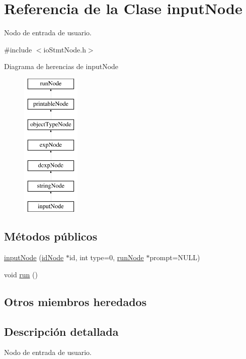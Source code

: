 \hypertarget{classinputNode}{\section{Referencia de la Clase input\-Node}
\label{classinputNode}
}


Nodo de entrada de usuario.  




{\ttfamily \#include $<$io\-Stmt\-Node.\-h$>$}

Diagrama de herencias de input\-Node\begin{figure}[H]
\begin{center}
\leavevmode
\includegraphics[height=7.000000cm]{classinputNode}
\end{center}
\end{figure}
\subsection*{Métodos públicos}
\begin{DoxyCompactItemize}
\item 
\hyperlink{classinputNode_a996e71eabef3f228d948bf8698381bad}{input\-Node} (\hyperlink{classidNode}{id\-Node} $\ast$id, int type=0, \hyperlink{classrunNode}{run\-Node} $\ast$prompt=N\-U\-L\-L)
\item 
void \hyperlink{classinputNode_a1fa415de6a36c066fbca49e9168b4d61}{run} ()
\end{DoxyCompactItemize}
\subsection*{Otros miembros heredados}


\subsection{Descripción detallada}
Nodo de entrada de usuario. 

